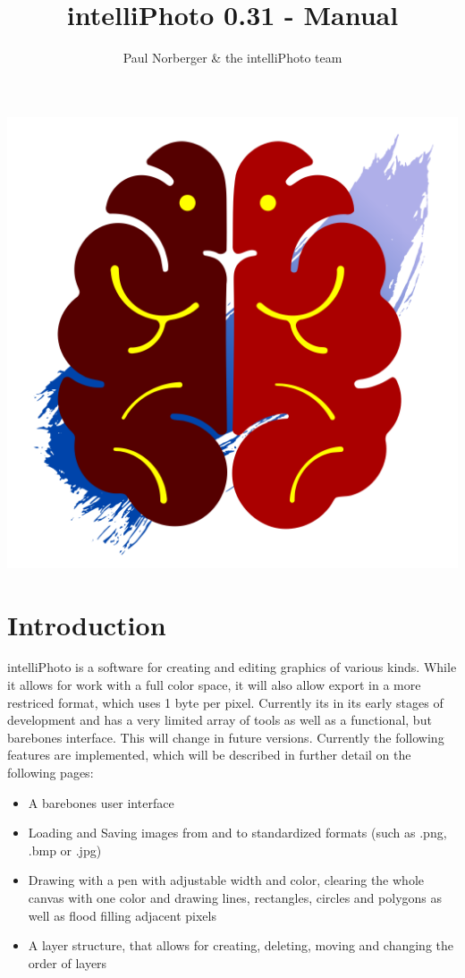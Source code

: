 \documentclass[a4paper, 12pt]{article}
\title{intelliPhoto 0.31 - Manual}
\author{Paul Norberger \& the intelliPhoto team}
\begin{document}
\begin{titlepage}
\maketitle
\thispagestyle{empty}
\begin{center}
\includegraphics[width=0.35\linewidth,keepaspectratio]{assets/icon}
\end{center}
\tableofcontents
\end{titlepage}
\section{Introduction}
intelliPhoto is a software for creating and editing graphics of various kinds. While it allows for work with a full color space, it will also allow export in a more restriced format, which uses 1 byte per pixel. Currently its in its early stages of development and has a very limited array of tools as well as a functional, but barebones interface. This will change in future versions.
Currently the following features are implemented, which will be described in further detail on the following pages:
\begin{itemize}
\item A barebones user interface
\item Loading and Saving images from and to standardized formats (such as .png, .bmp or .jpg)
\item Drawing with a pen with adjustable width and color, clearing the whole canvas with one color and drawing lines, rectangles, circles and polygons as well as flood filling adjacent pixels
\item A layer structure, that allows for creating, deleting, moving and changing the order of layers
\end{itemize}
\end{document}
